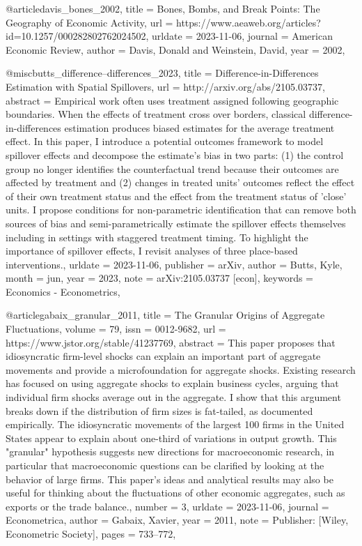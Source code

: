 

@article{davis_bones_2002,
	title = {Bones, {Bombs}, and {Break} {Points}: {The} {Geography} of {Economic} {Activity}},
	url = {https://www.aeaweb.org/articles?id=10.1257/000282802762024502},
	urldate = {2023-11-06},
	journal = {American Economic Review},
	author = {Davis, Donald and Weinstein, David},
	year = {2002},
}

@misc{butts_difference--differences_2023,
	title = {Difference-in-{Differences} {Estimation} with {Spatial} {Spillovers}},
	url = {http://arxiv.org/abs/2105.03737},
	abstract = {Empirical work often uses treatment assigned following geographic boundaries. When the effects of treatment cross over borders, classical difference-in-differences estimation produces biased estimates for the average treatment effect. In this paper, I introduce a potential outcomes framework to model spillover effects and decompose the estimate's bias in two parts: (1) the control group no longer identifies the counterfactual trend because their outcomes are affected by treatment and (2) changes in treated units' outcomes reflect the effect of their own treatment status and the effect from the treatment status of 'close' units. I propose conditions for non-parametric identification that can remove both sources of bias and semi-parametrically estimate the spillover effects themselves including in settings with staggered treatment timing. To highlight the importance of spillover effects, I revisit analyses of three place-based interventions.},
	urldate = {2023-11-06},
	publisher = {arXiv},
	author = {Butts, Kyle},
	month = jun,
	year = {2023},
	note = {arXiv:2105.03737 [econ]},
	keywords = {Economics - Econometrics},
}

@article{gabaix_granular_2011,
	title = {The {Granular} {Origins} of {Aggregate} {Fluctuations}},
	volume = {79},
	issn = {0012-9682},
	url = {https://www.jstor.org/stable/41237769},
	abstract = {This paper proposes that idiosyncratic firm-level shocks can explain an important part of aggregate movements and provide a microfoundation for aggregate shocks. Existing research has focused on using aggregate shocks to explain business cycles, arguing that individual firm shocks average out in the aggregate. I show that this argument breaks down if the distribution of firm sizes is fat-tailed, as documented empirically. The idiosyncratic movements of the largest 100 firms in the United States appear to explain about one-third of variations in output growth. This "granular" hypothesis suggests new directions for macroeconomic research, in particular that macroeconomic questions can be clarified by looking at the behavior of large firms. This paper's ideas and analytical results may also be useful for thinking about the fluctuations of other economic aggregates, such as exports or the trade balance.},
	number = {3},
	urldate = {2023-11-06},
	journal = {Econometrica},
	author = {Gabaix, Xavier},
	year = {2011},
	note = {Publisher: [Wiley, Econometric Society]},
	pages = {733--772},
}

